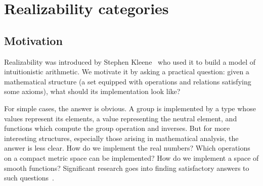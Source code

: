 \chapter{Realizability categories}
\label{chap:realizability}

\section{Motivation}
\label{sec:realizability-basic-idea}

Realizability was introduced by Stephen Kleene~ who used it to build a model of intuitionistic arithmetic. We motivate it by asking a practical question: given a mathematical structure (a set equipped with operations and relations satisfying some axioms), what should its implementation look like?

For simple cases, the answer is obvious. A group is implemented by a type whose values represent its elements, a value
representing the neutral element, and functions which compute the group operation and inverses.
But for more interesting structures, especially those arising in mathematical analysis, the answer is less clear. How do we implement the real numbers? Which operations on a compact metric space can be implemented? How do we implement a space of smooth functions? Significant research goes into finding satisfactory answers to such questions~.

